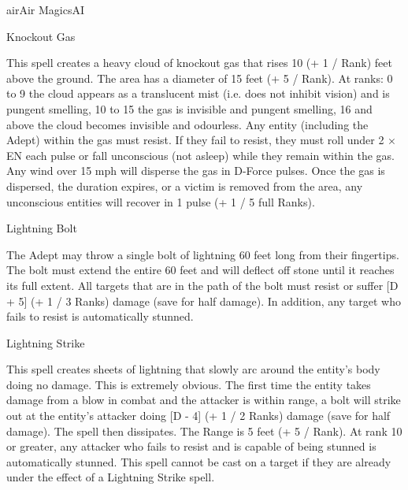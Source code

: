 \begin{College}[2.1]{air}{Air Magics}{AI}
\begin{spell}[S-9]{Knockout Gas}
\begin{effects}
This spell creates a heavy cloud of knockout gas that rises 10 (+ 1 /
Rank) feet above the ground.  The area has a diameter of 15 feet (+ 5
/ Rank).  At ranks: 0 to 9 the cloud appears as a translucent mist
(i.e. does not inhibit vision) and is pungent smelling, 10 to 15 the
gas is invisible and pungent smelling, 16 and above the cloud becomes
invisible and odourless.  Any entity (including the Adept) within the
gas must resist.  If they fail to resist, they must roll under 2 × EN
each pulse or fall unconscious (not asleep) while they remain within
the gas.  Any wind over 15 mph will disperse the gas in D-Force
pulses.  Once the gas is dispersed, the duration expires, or a victim
is removed from the area, any unconscious entities will recover in 1
pulse (+ 1 / 5 full Ranks).
\end{effects}
\end{spell}

\begin{spell}[S-10]{Lightning Bolt}

\begin{effects}
The Adept may throw a single bolt of lightning 60 feet long from their
fingertips.  The bolt must extend the entire 60 feet and will deflect
off stone until it reaches its full extent. All targets that are in
the path of the bolt must resist or suffer [D + 5] (+ 1 / 3 Ranks)
damage (save for half damage).  In addition, any target who fails to
resist is automatically stunned.
\end{effects}
\end{spell}

\begin{spell}[S-11]{Lightning Strike}

\begin{effects}
This spell creates sheets of lightning that slowly arc around the
entity’s body doing no damage.  This is extremely obvious.  The first
time the entity takes damage from a blow in combat and the attacker is
within range, a bolt will strike out at the entity’s attacker doing [D
  - 4] (+ 1 / 2 Ranks) damage (save for half damage).  The spell then
dissipates.  The Range is 5 feet (+ 5 / Rank).  At rank 10 or greater,
any attacker who fails to resist and is capable of being stunned is
automatically stunned.  This spell cannot be cast on a target if they
are already under the effect of a Lightning Strike spell.
\end{effects}
\end{spell}


\end{College}
